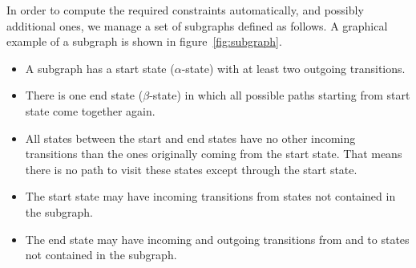 \documentclass[conference]{IEEEtran}
\begin{document}
In order to compute the required constraints automatically, and possibly additional ones, we manage a set of subgraphs defined as follows. A graphical example of a subgraph is shown in figure~\ref{fig:subgraph}.

\begin{itemize}
	\item A subgraph has a start state ($\alpha$-state) with at least two outgoing transitions.
	\item There is one end state ($\beta$-state) in which all possible paths starting from start state come together again.
	\item All states between the start and end states have no other incoming transitions than the ones originally coming from the start state. That means there is no path to visit these states except through the start state.
	\item The start state may have incoming transitions from states not contained in the subgraph.
	\item The end state may have incoming and outgoing transitions from and to states not contained in the subgraph.
\end{itemize}
\end{document}
